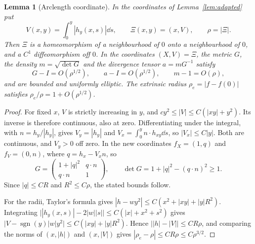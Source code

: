 \documentclass[11pt]{article}
\newtheorem{lemma}[theorem]{Lemma}
\theoremstyle{definition}\newtheorem{definition}[theorem]{Definition}
\theoremstyle{remark}\newtheorem{remark}[theorem]{Remark}
\begin{document}
\begin{lemma}[Arclength coordinate]\label{lem:arclength}
In the coordinates of Lemma~\ref{lem:adapted} put
\[
 V(x,y)=\int_0^y|h_y(x,s)|\dd s,\qquad \Xi(x,y)=(x,V),\qquad
 \rho=|\Xi|.
\]
Then $\Xi$ is a homeomorphism of a neighbourhood of $0$ onto a neighbourhood
of $0$, and a $C^1$ diffeomorphism off $0$. In the coordinates $(X,V)=\Xi$,
the metric $G$, the density $m=\sqrt{\det G}$ and the divergence tensor
$a=mG^{-1}$ satisfy
\[
 G-I=O(\rho^{1/2}),\qquad a-I=O(\rho^{1/2}),\qquad m-1=O(\rho),
\]
and are bounded and uniformly elliptic. The extrinsic radius
$\rho_e=|f-f(0)|$ satisfies $\rho_e/\rho=1+O(\rho^{1/2})$.
\end{lemma}
\begin{proof}
For fixed $x$, $V$ is strictly increasing in $y$, and
$cy^2\leq|V|\leq C(|xy|+y^2)$. Its inverse is therefore continuous, also at
zero. Differentiating under the integral, with $n=h_y/|h_y|$, gives
$V_y=|h_y|$ and $V_x=\int_0^yn\cdot h_{xy}\dd s$, so $|V_x|\leq C|y|$. Both are
continuous, and $V_y>0$ off zero. In the new coordinates $f_X=(1,q)$ and
$f_V=(0,n)$, where $q=h_x-V_xn$, so
\[
 G=\begin{pmatrix}1+|q|^2&q\cdot n\\q\cdot n&1\end{pmatrix},\qquad
 \det G=1+|q|^2-(q\cdot n)^2\geq1.
\]
Since $|q|\leq CR$ and $R^2\leq C\rho$, the stated bounds follow.

For the radii, Taylor's formula gives $|h-wy^2|\leq C(x^2+|xy|+|y|R^2)$.
Integrating $\bigl||h_y(x,s)|-2|w||s|\bigr|\leq C(|x|+x^2+s^2)$ gives
$\bigl|V-\operatorname{sgn}(y)|w|y^2\bigr|\leq C(|xy|+|y|R^2)$. Hence
$\bigl||h|-|V|\bigr|\leq CR\rho$, and comparing the norms of $(x,|h|)$ and
$(x,|V|)$ gives $|\rho_e-\rho|\leq CR\rho\leq C\rho^{3/2}$.
\end{proof}
\end{document}

